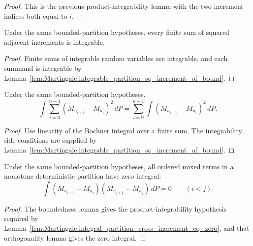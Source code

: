 \begin{proof}
This is the previous product-integrability lemma with the two increment
indices both equal to \(i\).
\end{proof}

\begin{lemma}\label{lem:Martingale.integrable_partition_sq_increment_sum_of_bound}
Under the same bounded-partition hypotheses, every finite sum of squared
adjacent increments is integrable.
\end{lemma}

\begin{proof}
Finite sums of integrable random variables are integrable, and each summand is
integrable by Lemma~\ref{lem:Martingale.integrable_partition_sq_increment_of_bound}.
\end{proof}

\begin{lemma}\label{lem:Martingale.integral_partition_sq_increment_sum_of_bound}
Under the same bounded-partition hypotheses,
\[
  \int \sum_{i=0}^{n-1}(M_{u_{i+1}}-M_{u_i})^2\,dP
  =
  \sum_{i=0}^{n-1}\int (M_{u_{i+1}}-M_{u_i})^2\,dP .
\]
\end{lemma}

\begin{proof}
Use linearity of the Bochner integral over a finite sum.  The integrability
side conditions are supplied by
Lemma~\ref{lem:Martingale.integrable_partition_sq_increment_of_bound}.
\end{proof}

\begin{lemma}\label{lem:Martingale.integral_partition_cross_increment_eq_zero_of_bound}
Under the same bounded-partition hypotheses, all ordered mixed terms in a
monotone deterministic partition have zero integral:
\[
  \int (M_{u_{i+1}}-M_{u_i})(M_{u_{j+1}}-M_{u_j})\,dP=0
  \qquad (i<j).
\]
\end{lemma}

\begin{proof}
The boundedness lemma gives the product-integrability hypothesis required by
Lemma~\ref{lem:Martingale.integral_partition_cross_increment_eq_zero}, and
that orthogonality lemma gives the zero integral.
\end{proof}

